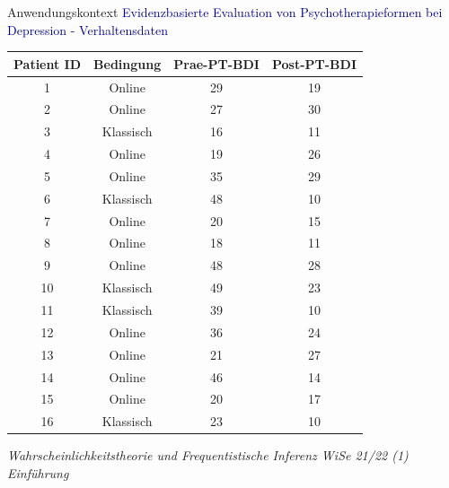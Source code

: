 \documentclass[
  8pt,
  ignorenonframetext,
]{beamer}
\begin{document}
\begin{frame}{Anwendungskontext}
\protect\hypertarget{anwendungskontext-2}{}
\textcolor{darkblue}{Evidenzbasierte Evaluation von Psychotherapieformen bei Depression - Verhaltensdaten}

\footnotesize

\begin{longtable}[]{@{}cccc@{}}
\toprule
Patient ID & Bedingung & Prae-PT-BDI & Post-PT-BDI \\
\midrule
\endhead
1 & Online & 29 & 19 \\
2 & Online & 27 & 30 \\
3 & Klassisch & 16 & 11 \\
4 & Online & 19 & 26 \\
5 & Online & 35 & 29 \\
6 & Klassisch & 48 & 10 \\
7 & Online & 20 & 15 \\
8 & Online & 18 & 11 \\
9 & Online & 48 & 28 \\
10 & Klassisch & 49 & 23 \\
11 & Klassisch & 39 & 10 \\
12 & Online & 36 & 24 \\
13 & Online & 21 & 27 \\
14 & Online & 46 & 14 \\
15 & Online & 20 & 17 \\
16 & Klassisch & 23 & 10 \\
\bottomrule
\end{longtable}

\footnotesize
\flushright

\emph{Wahrscheinlichkeitstheorie und Frequentistische Inferenz WiSe
21/22 (1) Einführung}
\end{frame}
\end{document}
